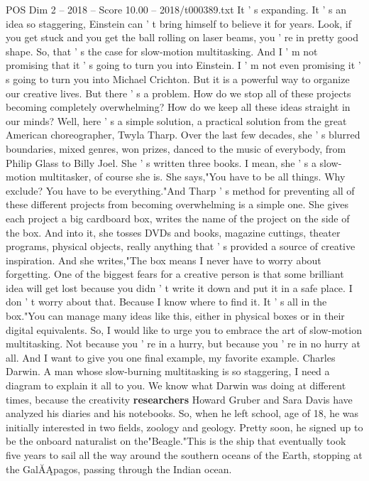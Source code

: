 \begin{textsample}{POS Dim 2 – 2018 – Score 10.00 – 2018/t000389.txt}
It ' s expanding.
It ' s an idea so staggering, Einstein can ' t bring himself to believe it for years.
Look, if you get stuck and you get the ball rolling on laser beams, you ' re in pretty good shape.
So, that ' s the case for slow-motion multitasking.
And I ' m not promising that it ' s going to turn you into Einstein.
I ' m not even promising it ' s going to turn you into Michael Crichton.
But it is a powerful way to organize our creative lives.
But there ' s a problem.
How do we stop all of these projects becoming completely overwhelming?
How do we keep all these ideas straight in our minds?
Well, here ' s a simple solution, a practical solution from the great American choreographer, Twyla Tharp.
Over the last few decades, she ' s blurred boundaries, mixed genres, won prizes, danced to the music of everybody, from Philip Glass to Billy Joel.
She ' s written three books.
I mean, she ' s a slow- motion multitasker, of course she is.
She says,"You have to be all things.
Why exclude?
You have to be everything."And Tharp ' s method for preventing all of these different projects from becoming overwhelming is a simple one.
She gives each project a big cardboard box, writes the name of the project on the side of the box.
And into it, she tosses DVDs and books, magazine cuttings, theater programs, physical objects, really anything that ' s provided a source of creative inspiration.
And she writes,"The box means I never have to worry about forgetting.
One of the biggest fears for a creative person is that some brilliant idea will get lost because you didn ' t write it down and put it in a safe place.
I don ' t worry about that.
Because I know where to find it.
It ' s all in the box."You can manage many ideas like this, either in physical boxes or in their digital equivalents.
So, I would like to urge you to embrace the art of slow-motion multitasking.
Not because you ' re in a hurry, but because you ' re in no hurry at all.
And I want to give you one final example, my favorite example.
Charles Darwin.
A man whose slow-burning multitasking is so staggering, I need a diagram to explain it all to you.
We know what Darwin was doing at different times, because the creativity \textbf{researchers} Howard Gruber and Sara Davis have analyzed his diaries and his notebooks.
So, when he left school, age of 18, he was initially interested in two fields, zoology and geology.
Pretty soon, he signed up to be the onboard naturalist on the"Beagle."This is the ship that eventually took five years to sail all the way around the southern oceans of the Earth, stopping at the GalĂĄpagos, passing through the Indian ocean.

\end{textsample}
